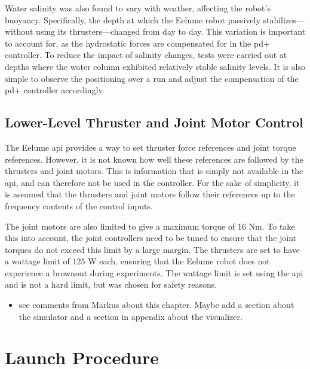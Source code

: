 Water salinity was also found to vary with weather, affecting the robot's 
buoyancy. Specifically, the depth at which the Eelume robot passively 
stabilizes—without using its thrusters—changed from day to day. This variation 
is important to account for, as the hydrostatic forces are compensated for in 
the \gls{pd+} controller. To reduce the impact of salinity changes, tests were 
carried out at depths where the water column exhibited relatively stable 
salinity levels. It is also simple to observe the positioning over a run
and adjust the compensation of the \gls{pd+} controller accordingly.

\subsection*{Lower-Level Thruster and Joint Motor Control}
The Eelume \gls{api} provides a way to set thruster force references and joint
torque references. However, it is not known how well these references are
followed by the thrusters and joint motors. This is information that is simply
not available in the \gls{api}, and can therefore not be used in the controller.
For the sake of simplicity, it is assumed that the thrusters and joint motors
follow their references up to the frequency contents of the control inputs.

The joint motors are also limited to give a maximum torque of \(16\) Nm. To take
this into account, the joint controllers need to be tuned to ensure that the
joint torques do not exceed this limit by a large margin. The thrusters are set
to have a wattage limit of \(125\) W each, ensuring that the Eelume robot does
not experience a brownout during experiments. The wattage limit is set using the
\gls{api} and is not a hard limit, but was chosen for safety reasons.

{
    \color{red}
    \begin{itemize}
        \item see comments from Markus about this chapter. Maybe add a section about the
            simulator and a section in appendix about the visualizer.
    \end{itemize}
}

\section{Launch Procedure}

